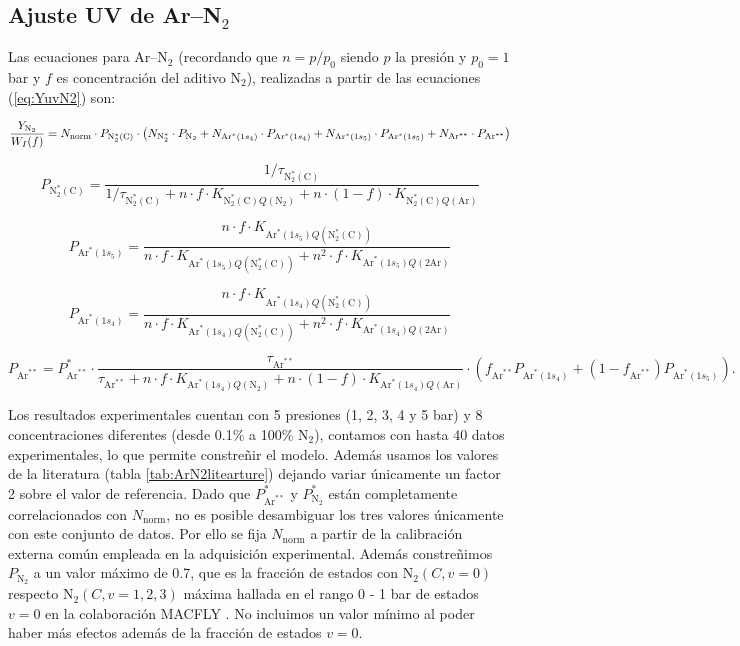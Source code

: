 \documentclass[12pt,a4paper]{article}
\newcommand{\N}{\mathrm{N}}
\newcommand{\Ar}{\mathrm{Ar}}
\newcommand{\NC}{\mathrm{N}_2^*(\mathrm{C})}
\newcommand{\norma}{\mathrm{norm}}
\DeclareRobustCommand{\ArOneSFour}{\ensuremath{\mathrm{Ar}^*(1s_4)}}
\DeclareRobustCommand{\ArOneSFive}{\ensuremath{\mathrm{Ar}^*(1s_5)}}
\begin{document}
\subsection{Ajuste UV de Ar--N$_2$}

Las ecuaciones para Ar--N$_2$ (recordando que $n=p/p_0$ siendo $p$ la presión y $p_0=1$ bar y $f$ es concentración del aditivo $\N_2$), realizadas a partir de las ecuaciones (\ref{eq:YuvN2}) son: 


\begin{equation*}
    \frac{Y_{\N_2}}{W_I(f)} 
    =
    {N_{\norma}}
    \cdot
    P_{\NC}
    \cdot
    \pqty{
      N_{\N_2^*}\cdot P_{\N_2}
      +
      N_{\ArOneSFour}\cdot P_{\ArOneSFour}
      +
      N_{\ArOneSFive}\cdot P_{\ArOneSFive}
      + N_{\Ar^{**}} \cdot P_{\Ar^{**}}
    }
\end{equation*}

\begin{equation}
    P_{\NC}
    =
    \frac{1/\tau_{\NC}}{
    1/\tau_{\NC}
    +
    n \cdot f \cdot K_{\NC Q(\N_2)}
    +
    n \cdot (1-f) \cdot K_{\NC Q(\Ar)}}
\end{equation}

\begin{equation}
    P_{\ArOneSFive}
    =
    \frac{n \cdot f \cdot K_{\ArOneSFive Q(\NC)}}{
    n \cdot f \cdot K_{\ArOneSFive Q(\NC)}
    +
    n^2 \cdot f \cdot K_{\ArOneSFive Q(2\Ar)}}
\end{equation}

\begin{equation}
    P_{\ArOneSFour}
    =
    \frac{n \cdot f \cdot K_{\ArOneSFour Q(\NC)}}{
    n \cdot f \cdot K_{\ArOneSFour Q(\NC)}
    +
    n^2 \cdot f \cdot K_{\ArOneSFour Q(2\Ar)}}
\end{equation}


\begin{equation*}
    P_{\Ar^{**}}
    = P_{\Ar^{**}}^* \cdot 
    \frac{\tau_{\Ar^{**}}}{\tau_{\Ar^{**}} + 
    n \cdot f \cdot K_{\ArOneSFour Q(\N_2)}
    +
    n \cdot (1-f) \cdot K_{\ArOneSFour Q(\Ar)}} \cdot (f_{\Ar^{**}} P_{\ArOneSFour} + (1-f_{\Ar^{**}}) P_{\ArOneSFive}) . 
\end{equation*}


Los resultados experimentales cuentan con 5 presiones (1, 2, 3, 4 y 5 bar) y 8 concentraciones diferentes (desde 0.1\% a 100\% $\N_2$), contamos con hasta 40 datos experimentales, lo que permite constreñir el modelo. Además usamos los valores de la literatura (tabla \ref{tab:ArN2litearture}) dejando variar únicamente un factor 2 sobre el valor de referencia. Dado que $P_{\Ar^{**}}^*$ y $P_{\N_2}^*$ están completamente correlacionados con $N_{\norma}$, no es posible desambiguar los tres valores únicamente con este conjunto de datos. Por ello se fija $N_{\norma}$ a partir de la calibración externa común empleada en la adquisición experimental. Además constreñimos $P_{\N_2}$ a un valor máximo de 0.7, que es la fracción de estados con $\N_2(C,v=0)$ respecto $\N_2(C,v=1,2,3)$ máxima hallada en el rango 0 - 1 bar de estados $v=0$ en la colaboración MACFLY \cite{colin2007macfly}. No incluimos un valor mínimo al poder haber más efectos además de la fracción de estados $v=0$.
\end{document}

